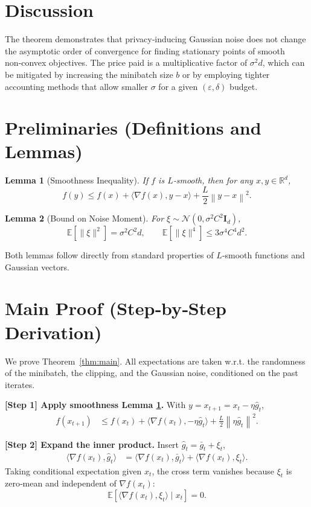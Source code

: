\documentclass{article}
\newtheorem{lemma}{Lemma}
\newcommand{\EE}{\mathbb{E}}
\newcommand{\RR}{\mathbb{R}}
\newcommand{\norm}[1]{\left\|#1\right\|}
\newcommand{\grad}{\nabla}
\begin{document}
\section*{Discussion}
The theorem demonstrates that privacy‑inducing Gaussian noise does not change the asymptotic order of convergence for finding stationary points of smooth non‑convex objectives. The price paid is a multiplicative factor of $\sigma^{2}d$, which can be mitigated by increasing the minibatch size $b$ or by employing tighter accounting methods that allow smaller $\sigma$ for a given $(\varepsilon,\delta)$ budget.

\newpage
\section*{Preliminaries (Definitions and Lemmas)}
\begin{lemma}[Smoothness Inequality]\label{lem:smooth}
If $f$ is $L$‑smooth, then for any $x,y\in\RR^{d}$,
\[
f(y)\le f(x)+\langle \grad f(x),y-x\rangle +\frac{L}{2}\norm{y-x}^{2}.
\]
\end{lemma}
\begin{lemma}[Bound on Noise Moment]\label{lem:noise}
For $\xi\sim\mathcal{N}(0,\sigma^{2}C^{2}\mathbf{I}_{d})$,
\[
\EE[\|\xi\|^{2}]=\sigma^{2}C^{2}d,\qquad
\EE[\|\xi\|^{4}]\le 3\sigma^{4}C^{4}d^{2}.
\]
\end{lemma}
Both lemmas follow directly from standard properties of $L$‑smooth functions and Gaussian vectors.

\section*{Main Proof (Step‑by‑Step Derivation)}
We prove Theorem~\ref{thm:main}. All expectations are taken w.r.t. the randomness of the minibatch, the clipping, and the Gaussian noise, conditioned on the past iterates.

\bigskip
\noindent\textbf{[Step 1] Apply smoothness Lemma \ref{lem:smooth}.}  
With $y=x_{t+1}=x_{t}-\eta\hat g_{t}$,
\begin{align}
f(x_{t+1}) 
&\le f(x_{t})+\langle \grad f(x_{t}), -\eta\hat g_{t}\rangle 
   +\frac{L}{2}\norm{\eta\hat g_{t}}^{2}. \label{eq:smooth1}
\end{align}

\noindent\textbf{[Step 2] Expand the inner product.}  
Insert $\hat g_{t}= \bar g_{t}+\xi_{t}$,
\begin{align}
\langle \grad f(x_{t}),\hat g_{t}\rangle 
&= \langle \grad f(x_{t}),\bar g_{t}\rangle 
   + \langle \grad f(x_{t}),\xi_{t}\rangle . \label{eq:inner}
\end{align}
Taking conditional expectation given $x_{t}$, the cross term vanishes because $\xi_{t}$ is zero‑mean and independent of $\grad f(x_{t})$:
\[
\EE[\langle \grad f(x_{t}),\xi_{t}\rangle\mid x_{t}]=0. \tag{S2.1}
\]
\end{document}
